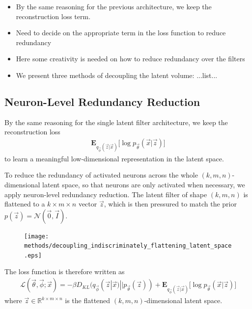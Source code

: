 \begin{itemize}
\item By the same reasoning for the previous architecture, we keep the reconstruction loss term. 
\item Need to decide on the appropriate term in the loss function to reduce redundancy
\item Here some creativity is needed on how to reduce redundancy over the filters
\item We present three methods of decoupling the latent volume: ...list...
\end{itemize}

%
%
\subsection{Neuron-Level Redundancy Reduction}

By the same reasoning for the single latent filter architecture, we keep the reconstruction loss 
\begin{align}
\mathbf{E}_{q_{\vec{\phi}}(\vec{z}|\vec{x})}\big[\log p_{\vec{\theta}}(\vec{x} | \vec{z}) \big]
\end{align}
to learn a meaningful low-dimensional representation in the latent space.

To reduce the redundancy of activated neurons across the whole $(k, m, n)$-dimensional latent space, so that neurons are only activated when necessary, we apply neuron-level redundancy reduction. The latent filter of shape $(k, m, n)$ is flattened to a $k \times m \times n$ vector $\vec{z}$, which is then pressured to match the prior $p(\vec{z}) = \mathcal{N}(\vec{0}, \vec{I})$.\\

\begin{figure}[h!]
\centering
\captionsetup{justification=centering}
\texttt{[image: methods/decoupling\_indiscriminately\_flattening\_latent\_space.eps]}
\label{fig:decoupling_indiscriminately_flattening_latent_space}
\end{figure}

The loss function is therefore written as 
\begin{align}
\mathcal{L}(\vec{\theta}, \vec{\phi}; \vec{x}) = -\beta D_{KL}(q_{\vec{\phi}}(\vec{z}|\vec{x}) || p_{\vec{\theta}}(\vec{z})) + \mathbf{E}_{q_{\vec{\phi}}(\vec{z}|\vec{x})}\big[\log p_{\vec{\theta}}(\vec{x} | \vec{z}) \big]
\end{align}
where $\vec{z} \in \mathbb{R}^{k \times m \times n}$ is the flattened $(k, m, n)$-dimensional latent space.


